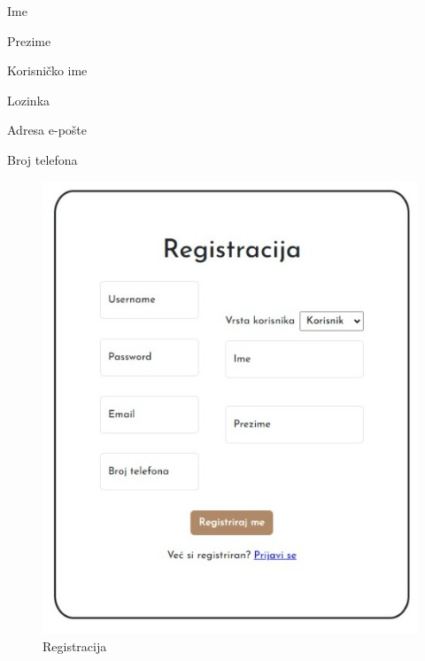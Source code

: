 		\begin{packed_item}
			\item Ime
			\item Prezime
			\item Korisničko ime
			\item Lozinka
			\item Adresa e-pošte
			\item Broj telefona
	    \end{packed_item}
	    
	    
	   	\begin{figure}[H]
	   		
	   		\includegraphics[scale =0.4]{registracija.JPEG}
	   		\centering
	   		\caption{Registracija}
	   		\label{fig:your_label}
	   \end{figure}
	   
